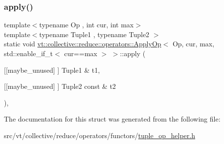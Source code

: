 \subsubsection{\texorpdfstring{apply()}{apply()}}
{\footnotesize\ttfamily template$<$typename Op , int cur, int max$>$ \\
template$<$typename Tuple1 , typename Tuple2 $>$ \\
static void \hyperlink{structvt_1_1collective_1_1reduce_1_1operators_1_1_apply_op}{vt\+::collective\+::reduce\+::operators\+::\+Apply\+Op}$<$ Op, cur, max, std\+::enable\+\_\+if\+\_\+t$<$ cur==max $>$ $>$\+::apply (\begin{DoxyParamCaption}\item[{\mbox{[}\mbox{[}maybe\+\_\+unused\mbox{]} \mbox{]} Tuple1 \&}]{t1,  }\item[{\mbox{[}\mbox{[}maybe\+\_\+unused\mbox{]} \mbox{]} Tuple2 const \&}]{t2 }\end{DoxyParamCaption})\hspace{0.3cm}{\ttfamily [inline]}, {\ttfamily [static]}}



The documentation for this struct was generated from the following file\+:\begin{DoxyCompactItemize}
\item 
src/vt/collective/reduce/operators/functors/\hyperlink{tuple__op__helper_8h}{tuple\+\_\+op\+\_\+helper.\+h}\end{DoxyCompactItemize}
